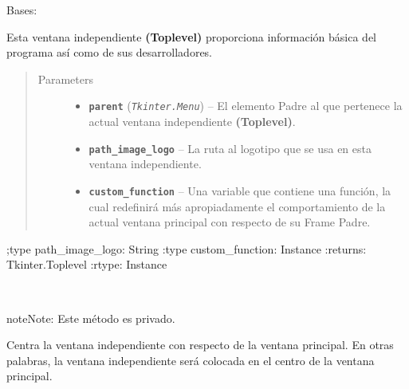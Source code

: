 \documentclass[letterpaper,10pt,english]{sphinxmanual}
\begin{document}
\begin{fulllineitems}
\label{View/Additional/MenuInternalOption/AboutToplevel:View.Additional.MenuInternalOption.AboutToplevel.AboutToplevel}
Bases: 

Esta ventana independiente \textbf{(Toplevel)} proporciona
información básica del programa así como de sus 
desarrolladores.
\begin{quote}\begin{description}
\item[{Parameters}] \leavevmode\begin{itemize}
\item {} 
\textbf{\texttt{parent}} (\emph{\texttt{Tkinter.Menu}}) -- El elemento Padre al que pertenece la actual
ventana independiente \textbf{(Toplevel)}.

\item {} 
\textbf{\texttt{path\_image\_logo}} -- La ruta al logotipo que se usa en esta ventana independiente.

\item {} 
\textbf{\texttt{custom\_function}} -- Una variable que contiene una función, la cual
redefinirá más apropiadamente el comportamiento de
la actual ventana principal con respecto de su Frame Padre.

\end{itemize}

\end{description}\end{quote}

;type path\_image\_logo: String
:type custom\_function: Instance
:returns: Tkinter.Toplevel
:rtype: Instance

\begin{fulllineitems}
\label{View/Additional/MenuInternalOption/AboutToplevel:View.Additional.MenuInternalOption.AboutToplevel.AboutToplevel._AboutToplevel__center}~
\begin{notice}{note}{Note:}
Este método es privado.
\end{notice}

Centra la ventana independiente con respecto de la ventana principal.
En otras palabras, la ventana independiente será colocada en el centro de la 
ventana principal.


\end{fulllineitems}
\end{fulllineitems}
\end{document}
